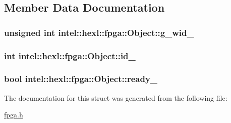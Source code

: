 \subsection{Member Data Documentation}
\hypertarget{structintel_1_1hexl_1_1fpga_1_1Object_a0da02feafb293ff8cea005f6312bd638}{
\subsubsection[{g\-\_\-wid\-\_\-}]{\setlength{\rightskip}{0pt plus 5cm}unsigned int intel\-::hexl\-::fpga\-::\-Object\-::g\-\_\-wid\-\_\-\hspace{0.3cm}{\ttfamily [static]}}}\label{structintel_1_1hexl_1_1fpga_1_1Object_a0da02feafb293ff8cea005f6312bd638}
\hypertarget{structintel_1_1hexl_1_1fpga_1_1Object_ade9313d87b44bc1bfeccca2f5829ceae}{
\subsubsection[{id\-\_\-}]{\setlength{\rightskip}{0pt plus 5cm}int intel\-::hexl\-::fpga\-::\-Object\-::id\-\_\-}}\label{structintel_1_1hexl_1_1fpga_1_1Object_ade9313d87b44bc1bfeccca2f5829ceae}
\hypertarget{structintel_1_1hexl_1_1fpga_1_1Object_a8d6495f3b68194f0c38927d76e9c652c}{
\subsubsection[{ready\-\_\-}]{\setlength{\rightskip}{0pt plus 5cm}bool intel\-::hexl\-::fpga\-::\-Object\-::ready\-\_\-}}\label{structintel_1_1hexl_1_1fpga_1_1Object_a8d6495f3b68194f0c38927d76e9c652c}


The documentation for this struct was generated from the following file\-:\begin{DoxyCompactItemize}
\item 
\hyperlink{fpga_8h}{fpga.\-h}\end{DoxyCompactItemize}
